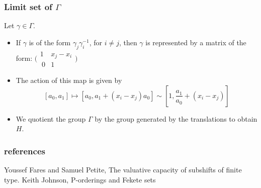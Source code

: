 \documentclass{beamer}
\theoremstyle{definition}
\begin{document}
\begin{frame}
\frametitle{Limit set of $\Gamma$}
Let $\gamma \in \Gamma$.
\begin{itemize}
\item If $\gamma$ is of the form $\gamma_j \gamma_i^{-1}$, for $i \neq j$, then $\gamma$  is represented by a matrix of the form:  $\bigl( \begin{smallmatrix}1 & x_j-x_i\\\ 0 & 1 \end{smallmatrix}\bigr)$
\item The action of this map is given by \[[a_0,a_1] \mapsto [a_0, a_1 + (x_i-x_j)a_0] \sim [1, \frac{a_1}{a_0} + (x_i-x_j) ]\]
\pause
\item We quotient the group $\Gamma$ by the group generated by the translations to obtain $H$.
\end{itemize}
\end{frame}



\begin{frame}
\frametitle{references}
\begin{thebibliography}{1}
 Youssef Fares and Samuel Petite, The valuative capacity of subshifts of finite type.
 Keith Johnson, P-orderings and Fekete sets
\end{thebibliography}
\end{frame}
\end{document}
